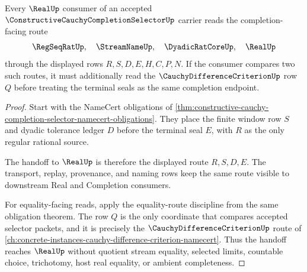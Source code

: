 \begin{theorem}
\label{thm:constructive-cauchy-completion-selector-regseq-real-handoff}
Every $\RealUp$ consumer of an accepted $\ConstructiveCauchyCompletionSelectorUp$ carrier reads the completion-facing route
$$
\RegSeqRatUp,\quad \StreamNameUp,\quad \DyadicRatCoreUp,\quad \RealUp
$$
through the displayed rows $R,S,D,E,H,C,P,N$. If the consumer compares two such routes, it must additionally read the $\CauchyDifferenceCriterionUp$ row $Q$ before treating the terminal seals as the same completion endpoint.
\end{theorem}
\begin{proof}
Start with the NameCert obligations of \autoref{thm:constructive-cauchy-completion-selector-namecert-obligations}. They place the finite window row $S$ and dyadic tolerance ledger $D$ before the terminal seal $E$, with $R$ as the only regular rational source.

The handoff to $\RealUp$ is therefore the displayed route $R,S,D,E$. The transport, replay, provenance, and naming rows keep the same route visible to downstream Real and Completion consumers.

For equality-facing reads, apply the equality-route discipline from the same obligation theorem. The row $Q$ is the only coordinate that compares accepted selector packets, and it is precisely the $\CauchyDifferenceCriterionUp$ route of \autoref{ch:concrete-instances-cauchy-difference-criterion-namecert}. Thus the handoff reaches $\RealUp$ without quotient stream equality, selected limits, countable choice, trichotomy, host real equality, or ambient completeness.
\end{proof}


\begin{closurestatus}{\ConstructiveCauchyCompletionSelectorUp}
  \theoryclosure{\seedClosure}
  \formalstatus{\unformalizedV}
\end{closurestatus}
